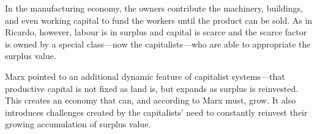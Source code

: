  In the manufacturing economy, the owners contribute the machinery, buildings, and even working capital to fund the workers until the product can be sold. %
As in Ricardo, however, labour is in surplus and capital is scarce and the scarce factor is owned by a special class---now the capitalists---who are able to appropriate the surplus value. %

Marx pointed to an additional dynamic feature of capitalist systems---that productive capital is not fixed as land is, but  expands as surplus is reinvested. This creates an economy that can, and according to Marx  must, grow. It also introduces challenges created by the capitalists' need to constantly reinvest their growing accumulation of surplus value. %


